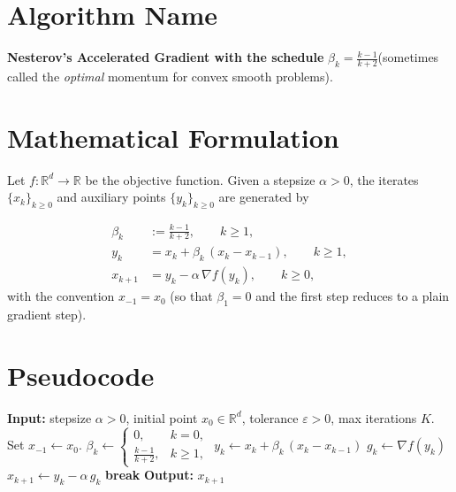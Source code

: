 \documentclass{article}
\newcommand{\norm}[1]{\left\lVert#1\right\rVert}
\begin{document}
\section*{Algorithm Name}
\textbf{Nesterov’s Accelerated Gradient with the schedule }$\displaystyle 
\beta_k=\frac{k-1}{k+2}$\quad (sometimes called the \emph{optimal} momentum for convex smooth problems).

\section*{Mathematical Formulation}
Let $f:\mathbb R^d\to\mathbb R$ be the objective function.
Given a stepsize $\alpha>0$, the iterates $\{x_k\}_{k\ge 0}$ and auxiliary points $\{y_k\}_{k\ge 0}$ are generated by  

\[
\boxed{
\begin{aligned}
\beta_k &:= \frac{k-1}{k+2},\qquad k\ge 1,\\[4pt]
y_k    &= x_k + \beta_k\,(x_k-x_{k-1}),\qquad k\ge 1,\\[4pt]
x_{k+1} &= y_k - \alpha\,\nabla f(y_k),\qquad k\ge 0,
\end{aligned}}
\]
with the convention $x_{-1}=x_0$ (so that $\beta_1=0$ and the first step reduces to a plain gradient step).

\section*{Pseudocode}
\begin{algorithm}[H]
\caption{Nesterov Accelerated Gradient (NAG) with schedule $\beta_k=\frac{k-1}{k+2}$}
\begin{algorithmic}[1]
\STATE \textbf{Input:} stepsize $\alpha>0$, initial point $x_0\in\mathbb R^d$, tolerance $\varepsilon>0$, max iterations $K$.
\STATE Set $x_{-1}\leftarrow x_0$.
    \STATE $\displaystyle\beta_k\leftarrow\begin{cases}
        0, & k=0,\\[2mm]
        \frac{k-1}{k+2}, & k\ge 1,
    \end{cases}$
    \STATE $y_k \leftarrow x_k + \beta_k\,(x_k-x_{k-1})$
    \STATE $g_k \leftarrow \nabla f(y_k)$
    \STATE $x_{k+1} \leftarrow y_k - \alpha\, g_k$
    \IF{$\norm{g_k}\le \varepsilon$}
        \STATE \textbf{break}
    \ENDIF
\ENDFOR
\STATE \textbf{Output:} $x_{k+1}$
\end{algorithmic}
\end{algorithm}
\end{document}
